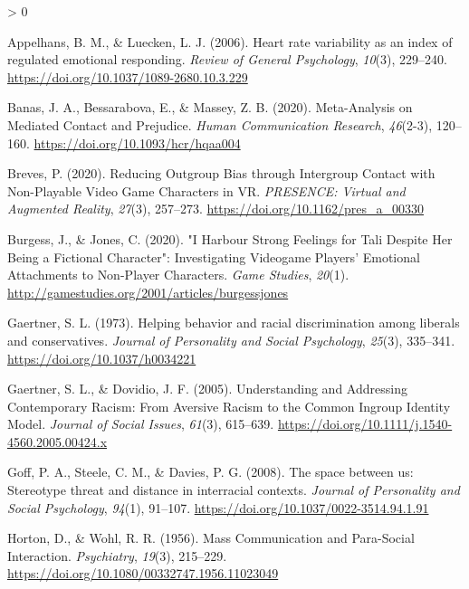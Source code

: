 \documentclass[
  english,
  man, noextraspace,floatsintext]{apa6}
\newlength{\cslhangindent}
\newenvironment{CSLReferences}[2] %
 {%
  \setlength{\parindent}{0pt}
  \ifodd #1 \everypar{\setlength{\hangindent}{\cslhangindent}}\ignorespaces\fi
  \ifnum #2 > 0
  \setlength{\parskip}{#2\baselineskip}
  \fi
 }%
 {}
\begin{document}
\hypertarget{refs}{}
\begin{CSLReferences}{1}{0}
\leavevmode\hypertarget{ref-appelhansHeartRateVariability2006}{}%
Appelhans, B. M., \& Luecken, L. J. (2006). Heart rate variability as an index of regulated emotional responding. \emph{Review of General Psychology}, \emph{10}(3), 229--240. \url{https://doi.org/10.1037/1089-2680.10.3.229}

\leavevmode\hypertarget{ref-banasMetaAnalysisMediatedContact2020}{}%
Banas, J. A., Bessarabova, E., \& Massey, Z. B. (2020). Meta-{Analysis} on {Mediated Contact} and {Prejudice}. \emph{Human Communication Research}, \emph{46}(2-3), 120--160. \url{https://doi.org/10.1093/hcr/hqaa004}

\leavevmode\hypertarget{ref-brevesReducingOutgroupBias2020}{}%
Breves, P. (2020). Reducing {Outgroup Bias} through {Intergroup Contact} with {Non}-{Playable Video Game Characters} in {VR}. \emph{PRESENCE: Virtual and Augmented Reality}, \emph{27}(3), 257--273. \url{https://doi.org/10.1162/pres_a_00330}

\leavevmode\hypertarget{ref-burgessHarbourStrongFeelings2020}{}%
Burgess, J., \& Jones, C. (2020). {"}{I Harbour Strong Feelings} for {Tali Despite Her Being} a {Fictional Character}{"}: {Investigating Videogame Players}' {Emotional Attachments} to {Non}-{Player Characters}. \emph{Game Studies}, \emph{20}(1). \url{http://gamestudies.org/2001/articles/burgessjones}

\leavevmode\hypertarget{ref-gaertnerHelpingBehaviorRacial1973}{}%
Gaertner, S. L. (1973). Helping behavior and racial discrimination among liberals and conservatives. \emph{Journal of Personality and Social Psychology}, \emph{25}(3), 335--341. \url{https://doi.org/10.1037/h0034221}

\leavevmode\hypertarget{ref-gaertnerUnderstandingAddressingContemporary2005}{}%
Gaertner, S. L., \& Dovidio, J. F. (2005). Understanding and {Addressing Contemporary Racism}: {From Aversive Racism} to the {Common Ingroup Identity Model}. \emph{Journal of Social Issues}, \emph{61}(3), 615--639. \url{https://doi.org/10.1111/j.1540-4560.2005.00424.x}

\leavevmode\hypertarget{ref-goffSpaceUsStereotype2008}{}%
Goff, P. A., Steele, C. M., \& Davies, P. G. (2008). The space between us: {Stereotype} threat and distance in interracial contexts. \emph{Journal of Personality and Social Psychology}, \emph{94}(1), 91--107. \url{https://doi.org/10.1037/0022-3514.94.1.91}

\leavevmode\hypertarget{ref-hortonMassCommunicationParaSocial1956}{}%
Horton, D., \& Wohl, R. R. (1956). Mass {Communication} and {Para}-{Social Interaction}. \emph{Psychiatry}, \emph{19}(3), 215--229. \url{https://doi.org/10.1080/00332747.1956.11023049}


\end{CSLReferences}
\end{document}
